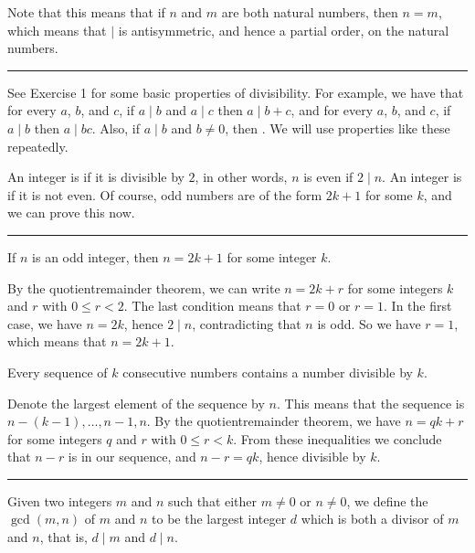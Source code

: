 \documentclass[letterpaper,10pt,english]{sphinxmanual}
\begin{document}
\sphinxAtStartPar
Note that this means that if \(n\) and \(m\) are both natural numbers, then \(n = m\), which means that \(\mid\) is antisymmetric, and hence a partial order, on the natural numbers.


\bigskip\hrule\bigskip


\sphinxAtStartPar
See Exercise 1 for some basic properties of divisibility. For example, we have that for every \(a\), \(b\), and \(c\), if \(a \mid b\) and \(a \mid c\) then \(a \mid b + c\), and for every \(a\), \(b\), and \(c\), if \(a \mid b\) then \(a \mid bc\). Also, if \(a \mid b\) and \(b \ne 0\), then . We will use properties like these repeatedly.

\sphinxAtStartPar
An integer is  if it is divisible by \(2\), in other words, \(n\) is even if \(2 \mid n\). An integer is  if it is not even. Of course, odd numbers are of the form \(2k+1\) for some \(k\), and we can prove this now.


\bigskip\hrule\bigskip


\sphinxAtStartPar
{} If \(n\) is an odd integer, then \(n=2k+1\) for some integer \(k\).

\sphinxAtStartPar
{} By the quotient\sphinxhyphen{}remainder theorem, we can write \(n = 2k+r\) for some integers \(k\) and \(r\) with \(0\le r < 2\). The last condition means that \(r = 0\) or \(r = 1\). In the first case, we have \(n = 2k\), hence \(2 \mid n\), contradicting that \(n\) is odd. So we have \(r = 1\), which means that \(n = 2k+1\).

\sphinxAtStartPar
{} Every sequence of \(k\) consecutive numbers contains a number divisible by \(k\).

\sphinxAtStartPar
{} Denote the largest element of the sequence by \(n\). This means that the sequence is \(n - (k - 1), \ldots, n - 1, n\). By the quotient\sphinxhyphen{}remainder theorem, we have \(n = q k + r\) for some integers \(q\) and \(r\) with \(0\leq r < k\). From these inequalities we conclude that \(n - r\) is in our sequence, and \(n - r = q k\), hence divisible by \(k\).


\bigskip\hrule\bigskip


\sphinxAtStartPar
{} Given two integers \(m\) and \(n\) such that either \(m \neq 0\) or \(n \neq 0\), we define the  \(\gcd(m,n)\) of \(m\) and \(n\) to be the largest integer \(d\) which is both a divisor of \(m\) and \(n\), that is, \(d \mid m\) and \(d \mid n\).
\end{document}
